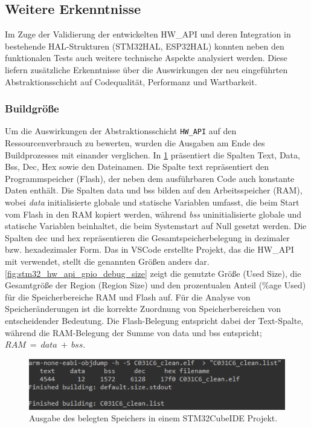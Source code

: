 \subsection{Weitere Erkenntnisse}
Im Zuge der Validierung der entwickelten HW\_API und deren Integration in bestehende HAL-Strukturen (STM32HAL, ESP32HAL) konnten neben den funktionalen Tests auch weitere technische Aspekte analysiert werden. 
Diese liefern zusätzliche Erkenntnisse über die Auswirkungen der neu eingeführten Abstraktionsschicht auf Codequalität, Performanz und Wartbarkeit.

\subsubsection{Buildgröße}
Um die Auswirkungen der Abstraktionsschicht \texttt{HW\_API} auf den Ressourcenverbrauch zu bewerten, wurden die Ausgaben am Ende des Buildprozesses mit einander verglichen.
In \cref{fig:stm32_cube_gpio_debug_size} präsentiert die Spalten Text, Data, Bss, Dec, Hex sowie den Dateinamen.
Die Spalte text repräsentiert den Programmspeicher (Flash), der neben dem  ausführbaren Code auch konstante Daten enthält. 
Die Spalten data und bss bilden auf den Arbeitsspeicher (RAM), wobei \textit{data} initialisierte globale und statische Variablen umfasst, die beim Start vom Flash in den RAM kopiert werden, während \textit{bss} uninitialisierte globale und statische Variablen beinhaltet, die beim Systemstart auf Null gesetzt werden. 
Die Spalten dec und hex repräsentieren die Gesamtspeicherbelegung in dezimaler bzw. hexadezimaler Form.
Das in VSCode erstellte Projekt, das die HW\_API mit verwendet, stellt die genannten Größen anders dar.
\cref{fig:stm32_hw_api_gpio_debug_size} zeigt die genutzte Größe (Used Size), die Gesamtgröße der Region (Region Size) und den prozentualen Anteil (\%age Used) für die Speicherbereiche RAM und Flash auf. 
Für die Analyse von Speicheränderungen ist die korrekte Zuordnung von Speicherbereichen von entscheidender Bedeutung. 
Die Flash-Belegung entspricht dabei der Text-Spalte, während die RAM-Belegung der Summe von data und bss entspricht; $RAM\ =\ data\ +\ bss$.


\begin{figure}[H]
	\includegraphics[width=\textwidth]{Pics/stm32c031c6_gpio_debug_size.png}
	\caption{Ausgabe des belegten Speichers in einem STM32CubeIDE Projekt.}
	\label{fig:stm32_cube_gpio_debug_size}
\end{figure}

